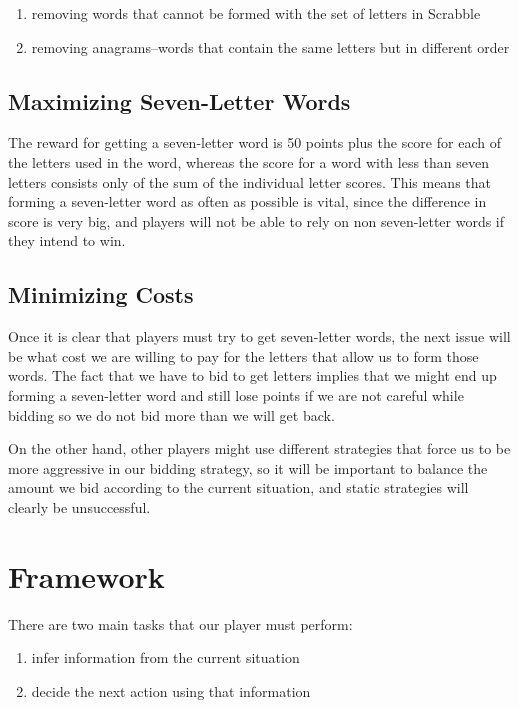 \documentclass[11pt]{article}
\begin{document}
\begin{enumerate}
\item removing words that cannot be formed with the set of letters in Scrabble
\item removing anagrams--words that contain the same letters but in different order
\end{enumerate}

\subsection{Maximizing Seven-Letter Words}

The reward for getting a seven-letter word is 50 points plus the score for each of the letters used in the word, whereas the score for a word with less than seven letters consists only of the sum of the individual letter scores. This means that forming a seven-letter word as often as possible is vital, since the difference in score is very big, and players will not be able to rely on non seven-letter words if they intend to win.

\subsection{Minimizing Costs}

Once it is clear that players must try to get seven-letter words, the next issue will be what cost we are willing to pay for the letters that allow us to form those words. The fact that we have to bid to get letters implies that we might end up forming a seven-letter word and still lose points if we are not careful while bidding so we do not bid more than we will get back. 

On the other hand, other players might use different strategies that force us to be more aggressive in our bidding strategy, so it will be important to balance the amount we bid according to the current situation, and static strategies will clearly be unsuccessful. 

\section{Framework}

There are two main tasks that our player must perform:

\begin{enumerate}
\item infer information from the current situation
\item decide the next action using that information
\end{enumerate}
\end{document}
